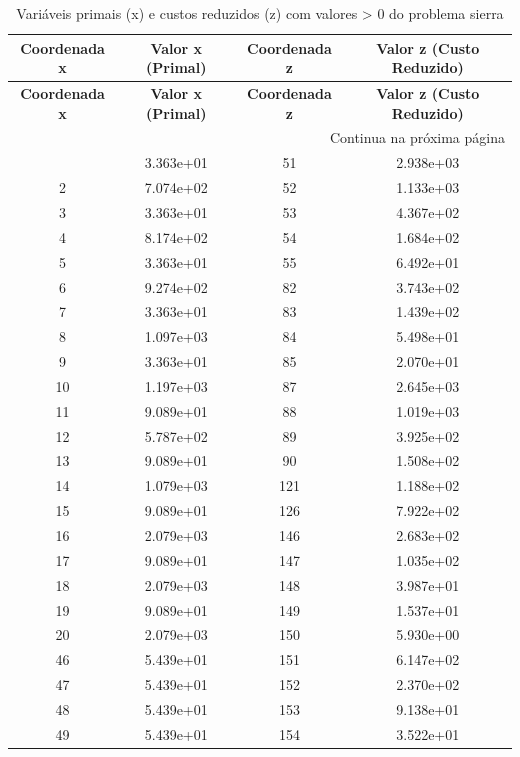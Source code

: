 \documentclass[12pt]{article}
\begin{document}
\begin{longtable}{@{}cccc@{}}
\caption{Variáveis primais (x) e custos reduzidos (z) com valores > 0 do problema sierra} \\
\toprule
\textbf{Coordenada x} & \textbf{Valor x (Primal)} & \textbf{Coordenada z} & \textbf{Valor z (Custo Reduzido)} \\
\midrule
\endfirsthead

\toprule
\textbf{Coordenada x} & \textbf{Valor x (Primal)} & \textbf{Coordenada z} & \textbf{Valor z (Custo Reduzido)} \\
\midrule
\endhead

\midrule \multicolumn{4}{r}{{Continua na próxima página}} \\ \midrule
\endfoot

\bottomrule
\endlastfoot
1 & 3.363e+01 & 51 & 2.938e+03 \\
2 & 7.074e+02 & 52 & 1.133e+03 \\
3 & 3.363e+01 & 53 & 4.367e+02 \\
4 & 8.174e+02 & 54 & 1.684e+02 \\
5 & 3.363e+01 & 55 & 6.492e+01 \\
6 & 9.274e+02 & 82 & 3.743e+02 \\
7 & 3.363e+01 & 83 & 1.439e+02 \\
8 & 1.097e+03 & 84 & 5.498e+01 \\
9 & 3.363e+01 & 85 & 2.070e+01 \\
10 & 1.197e+03 & 87 & 2.645e+03 \\
11 & 9.089e+01 & 88 & 1.019e+03 \\
12 & 5.787e+02 & 89 & 3.925e+02 \\
13 & 9.089e+01 & 90 & 1.508e+02 \\
14 & 1.079e+03 & 121 & 1.188e+02 \\
15 & 9.089e+01 & 126 & 7.922e+02 \\
16 & 2.079e+03 & 146 & 2.683e+02 \\
17 & 9.089e+01 & 147 & 1.035e+02 \\
18 & 2.079e+03 & 148 & 3.987e+01 \\
19 & 9.089e+01 & 149 & 1.537e+01 \\
20 & 2.079e+03 & 150 & 5.930e+00 \\
46 & 5.439e+01 & 151 & 6.147e+02 \\
47 & 5.439e+01 & 152 & 2.370e+02 \\
48 & 5.439e+01 & 153 & 9.138e+01 \\
49 & 5.439e+01 & 154 & 3.522e+01 \\

\end{longtable}
\end{document}
